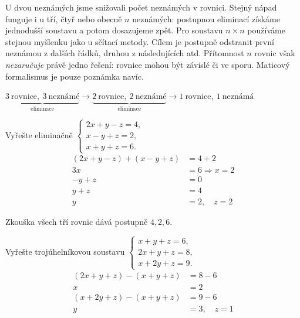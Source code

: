 \documentclass[11pt,a4paper]{article}
\begin{document}
U dvou neznámých jsme snižovali počet neznámých v rovnici. Stejný nápad funguje i u tří, čtyř nebo obecně $n$ neznámých: postupnou eliminací získáme jednodušší soustavu a potom dosazujeme zpět.
Pro soustavu $n\times n$ používáme stejnou myšlenku jako u sčítací metody. Cílem je postupně odstranit první neznámou z dalších řádků, druhou z následujících atd. Přítomnost $n$ rovnic však \emph{nezaručuje} právě jedno řešení: rovnice mohou být závislé či ve sporu. Maticový formalismus je pouze poznámka navíc.

\begin{center}\small
\(\underbrace{3\ \text{rovnice},\ 3\ \text{neznámé}}_{\text{eliminace}}\longrightarrow
\underbrace{2\ \text{rovnice},\ 2\ \text{neznámé}}_{\text{eliminace}}\longrightarrow
1\ \text{rovnice},\ 1\ \text{neznámá}\)
\end{center}
\begin{prikladReseniBox}[title={Příklad 1}]
Vyřešte eliminačně $\begin{cases}2x+y-z=4,\\x-y+z=2,\\x+y+z=6.\end{cases}$
\tcblower
\begin{align*}
(2x+y-z)+(x-y+z)&=4+2 \\
 3x&=6\Rightarrow x=2 \\
 -y+z&=0 \\
 y+z&=4 \\
 y&=2,\quad z=2
\end{align*}

Zkouška všech tří rovnic dává postupně $4,2,6$.
\end{prikladReseniBox}
\begin{prikladReseniBox}[title={Příklad 2}]
Vyřešte trojúhelníkovou soustavu $\begin{cases}x+y+z=6,\\2x+y+z=8,\\x+2y+z=9.\end{cases}$
\tcblower
\begin{align*}
(2x+y+z)-(x+y+z)&=8-6 \\
 x&=2 \\
 (x+2y+z)-(x+y+z)&=9-6 \\
 y&=3,\quad z=1
\end{align*}
\end{prikladReseniBox}
\end{document}
